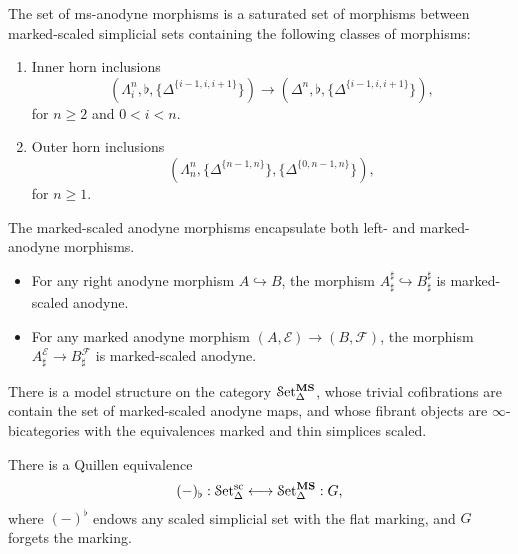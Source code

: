 \documentclass[main.tex]{subfiles}
\begin{document}
\begin{definition}
  \label{def:ms-anodyne_morphisms}
  The set of ms-anodyne morphisms is a saturated set of morphisms between marked-scaled simplicial sets containing the following classes of morphisms:
  \begin{enumerate}[label=(A\arabic*)]
    \item\label{item:innerms} Inner horn inclusions
      \begin{equation*}
        (\Lambda^{n}_{i}, \flat, \{\Delta^{\{i-1,i,i+1\}}\}) \to (\Delta^{n}, \flat, \{\Delta^{\{i-1,i,i+1\}}\}),
      \end{equation*}
      for $n \geq 2$ and $0 < i < n$.

    \item\label{item:outerms} Outer horn inclusions
      \begin{equation*}
        (\Lambda^{n}_{n}, \{\Delta^{\{n-1,n\}}\}, \{\Delta^{\{0, n-1, n\}}\}),
      \end{equation*}
      for $n \geq 1$.
  \end{enumerate}
\end{definition}

\begin{example}
  \label{prop:sharp_marked_right_anodyne}
  The marked-scaled anodyne morphisms encapsulate both left- and marked-anodyne morphisms.
  \begin{itemize}
    \item For any right anodyne morphism $A \hookrightarrow B$, the morphism $A^{\sharp}_{\sharp} \hookrightarrow B^{\sharp}_{\sharp}$ is marked-scaled anodyne.

    \item For any marked anodyne morphism $(A, \mathcal{E}) \to (B, \mathcal{F})$, the morphism $A^{\mathcal{E}}_{\sharp} \to B^{\mathcal{F}}_{\sharp}$ is marked-scaled anodyne.
  \end{itemize}
\end{example}

\begin{theorem}
  There is a model structure on the category $\mathcal{S}\mathrm{et}_{\Delta}^{\mathbf{MS}}$, whose trivial cofibrations are contain the set of marked-scaled anodyne maps, and whose fibrant objects are $\infty$-bicategories with the equivalences marked and thin simplices scaled.
\end{theorem}

\begin{theorem}
  \label{thm:quillen_equiv_ms_and_scaled}
  There is a Quillen equivalence
  \begin{equation*}
    (-)_{\flat} : \mathcal{S}\mathrm{et}_{\Delta}^{\mathrm{sc}} \longleftrightarrow \mathcal{S}\mathrm{et}_{\Delta}^{\mathbf{MS}} : G,
  \end{equation*}
  where $(-)^{\flat}$ endows any scaled simplicial set with the flat marking, and $G$ forgets the marking.
\end{theorem}
\end{document}
